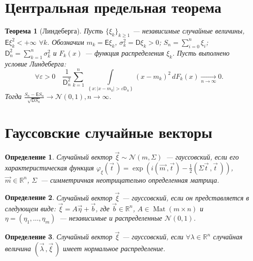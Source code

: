 \documentclass[11pt]{article}
\newtheorem{theorem}{Теорема}[section]
\newtheorem{definition}{Определение}
\DeclareMathOperator{\mat}{Mat}
\begin{document}
    \section[]{Центральная предельная теорема}
        \begin{theorem}[Линдеберга]
            Пусть $\{\xi_k\}_{k \geqslant 1}$ --- независимые случайные величины, $\mathsf{E} \xi_k^2 < + \infty$ $\forall k$. 
            Обозначим $m_k = \mathsf{E} \xi_k$, $\sigma_k^2 = \mathsf{D} \xi_k > 0$; $S_n = \sum_{i=0}^{n} \xi_i$; $\mathsf{D}_n^2 = \sum_{k=1}^{n} \sigma_k^2$ и $F_k(x)$ --- функция распределения $\xi_k$. 
            Пусть выполнено условие Линдеберга:
                $$ \forall \varepsilon > 0\quad \frac{1}{\mathsf{D}_n^2} \sum\limits_{k=1}^{n}\,\int\limits_{\left\{x : |x-m_k| > \varepsilon\mathsf{D}_n \right\}}{(x - m_k)^2 \,dF_k(x)} \xrightarrow[n \rightarrow \infty]{} 0. $$
            Тогда $\frac{S_n - \mathsf{E} S_n}{\sqrt{\mathsf{D} S_n}} \longrightarrow{} \mathcal{N}(0,1), n \rightarrow \infty$.
        \end{theorem}

    \section[]{Гауссовские случайные векторы}
        \begin{definition}
            Случайный вектор $\vec {\xi} \sim \mathcal{N}(m,\Sigma)$~--- гауссовский, если его характеристическая функция $\varphi_{\xi}(\vec{t}\,) = \exp{\left(i\left(\vec{m\,}, \vec{t\,}\right) - \frac{1}{2}\left(\Sigma \vec{t}\,, \vec{t}\, \right)\right)}$, $\vec{m} \in \mathbb{R}^n$, $\Sigma$~--- симметричная неотрицательно определенная матрица.
        \end{definition}

        \begin{definition}
            Случайный вектор $\vec {\xi}$ --- гауссовский, если он представляется в следующем виде: $\vec \xi = A \vec \eta + \vec b$, где $\vec b \in \mathbb{R}^n$, $A \in \mat{(m \times n)}$ и $\eta = (\eta_1, \dots, \eta_m)$~--- независимые и распределенные $\mathcal{N}(0,1)$.
        \end{definition}
        
        \begin{definition}
            Случайный вектор $\vec {\xi}$ --- гауссовский, если $\forall\lambda \in \mathbb{R}^n$ случайная величина $(\vec \lambda\,, \vec {\xi}\,)$ имеет нормальное распределение.
        \end{definition}
        
\end{document}

